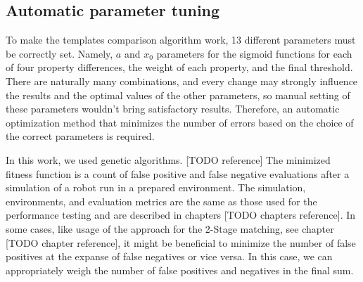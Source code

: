 \subsection{Automatic parameter tuning}

To make the templates comparison algorithm work, 13 different parameters must be correctly set. Namely, $a$ and $x_0$ parameters for the sigmoid functions for each of four property differences, the weight of each property, and the final threshold. There are naturally many combinations, and every change may strongly influence the results and the optimal values of the other parameters, so manual setting of these parameters wouldn't bring satisfactory results. Therefore, an automatic optimization method that minimizes the number of errors based on the choice of the correct parameters is required.\par
In this work, we used genetic algorithms. [TODO reference] The minimized fitness function is a count of false positive and false negative evaluations after a simulation of a robot run in a prepared environment. The simulation, environments, and evaluation metrics are the same as those used for the performance testing and are described in chapters [TODO chapters reference]. In some cases, like usage of the approach for the 2-Stage matching, see chapter [TODO chapter reference], it might be beneficial to minimize the number of false positives at the expanse of false negatives or vice versa. In this case, we can appropriately weigh the number of false positives and negatives in the final sum.